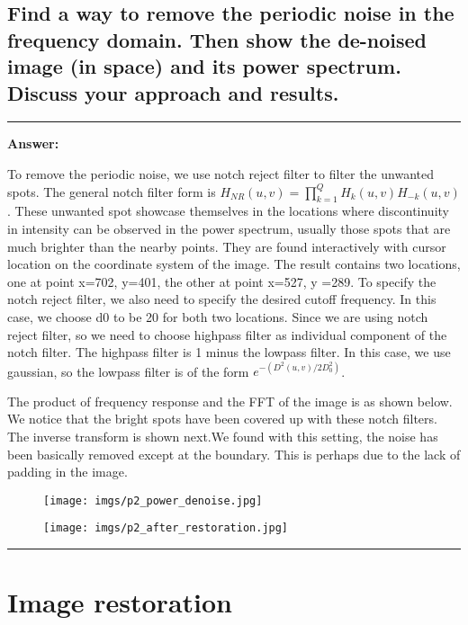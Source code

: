 \documentclass[conference]{styles/acmsiggraph}
\newenvironment{answer}{}{}
\begin{document}
\subsection{Find a way to remove the periodic noise in the frequency domain. Then show the de-noised image
(in space) and its power spectrum. Discuss your approach and results.}
\begin{answer}
	\rule{\textwidth}{0.4pt}
	\textbf{Answer:}	
	
	To remove the periodic noise, we use notch reject filter to filter the unwanted spots. The general notch filter form is $H_{NR}(u,v) = \prod_{k=1}^{Q}H_k (u,v)H_{-k}(u,v)$. These unwanted spot showcase themselves in the locations where discontinuity in intensity can be observed in the power spectrum, usually those spots that are much brighter than the nearby points. They are found interactively with cursor location on the coordinate system of the image. The result contains two locations, one at point x=702, y=401, the other at point x=527, y =289. To specify the notch reject filter, we also need to specify the desired cutoff frequency. In this case, we choose d0 to be 20 for both two locations. Since we are using notch reject filter, so we need to choose highpass filter as individual component of the notch filter. The highpass filter is 1 minus the lowpass filter. In this case, we use gaussian, so the lowpass filter is of the form $e^{-(D^{2}(u,v)/2D_0^{2})}$.

	The product of frequency response and the FFT of the image is as shown below. We notice that the bright spots have been covered up with these notch filters. The inverse transform is shown next.We found with this setting, the noise has been basically removed except at the boundary. This is perhaps due to the lack of padding in the image.
	\begin{figure}[H]
	\centering
	\texttt{[image: imgs/p2\_power\_denoise.jpg]}
	\end{figure}	
	\begin{figure}[H]
	\centering
	\texttt{[image: imgs/p2\_after\_restoration.jpg]}
	\end{figure}	

	\rule{\textwidth}{0.4pt}
\end{answer}


\section{Image restoration}
\end{document}
